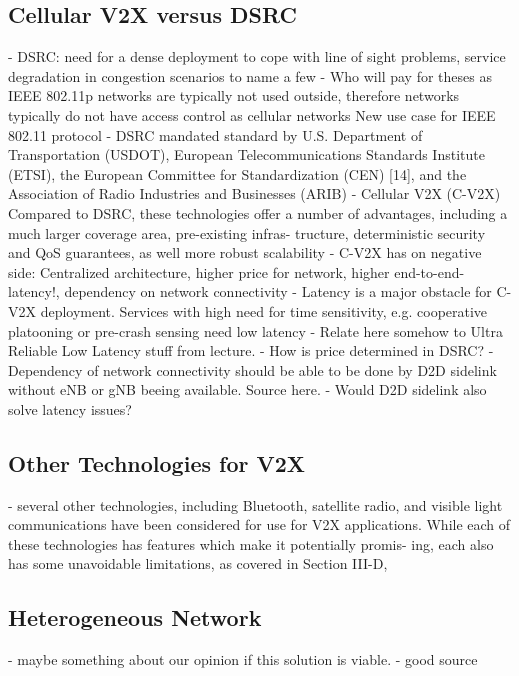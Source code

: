 \documentclass[conference,12pt,onecolumn]{IEEEtran}
\begin{document}
\subsection{Cellular V2X versus DSRC}
- DSRC: need for a dense deployment to cope with line of sight problems, service degradation in congestion scenarios to name a few \cite{kenney2011}
- Who will pay for theses as IEEE 802.11p networks are typically not used outside, therefore networks typically do not have access control as cellular networks \cite{kenney2011} New use case for IEEE 802.11 protocol
- DSRC mandated standard by U.S. Department of Transportation (USDOT), European Telecommunications Standards Institute (ETSI), the European Committee for Standardization (CEN) [14], and the Association of Radio Industries and Businesses (ARIB) \cite{kenney2011}
- Cellular V2X (C-V2X) Compared to DSRC, these technologies offer a number of advantages, including a much larger coverage area, pre-existing infras- tructure, deterministic security and QoS guarantees, as well more robust scalability \cite{kenney2011}
- C-V2X has on negative side: Centralized architecture, higher price for network, higher end-to-end-latency!, dependency on network connectivity \cite{kenney2011}
- Latency is a major obstacle for C-V2X deployment. Services with high need for time sensitivity, e.g. cooperative platooning or pre-crash sensing need low latency \cite{kenney2011}
- Relate here somehow to Ultra Reliable Low Latency stuff from lecture.
- How is price determined in DSRC?
- Dependency of network connectivity should be able to be done by D2D sidelink without eNB or gNB beeing available. Source here.
- Would D2D sidelink also solve latency issues?

\subsection{Other Technologies for V2X}
- several other technologies, including Bluetooth, satellite radio, and visible light communications have been considered for use for V2X applications. While each of these technologies has features which make it potentially promis- ing, each also has some unavoidable limitations, as covered in Section III-D, \cite{kenney2011}

\subsection{Heterogeneous Network}
- maybe something about our opinion if this solution is viable.
- good source \cite{zheng2015}
\end{document}
